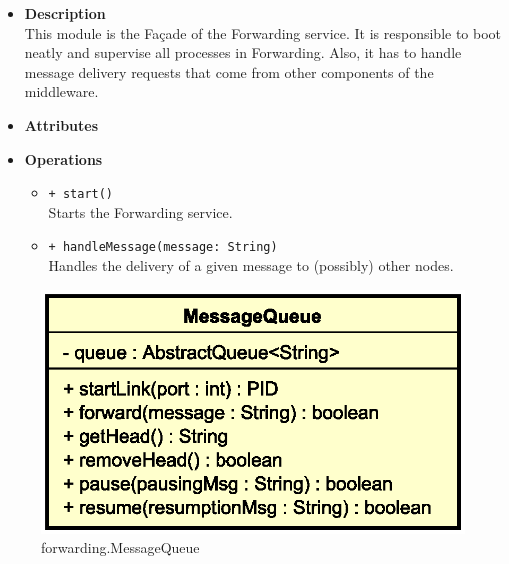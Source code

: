 \FloatBarrier
\begin{itemize}
  \item \textbf{Description} \\
    This module is the Fa\c cade of the Forwarding service. It is responsible
    to boot neatly and supervise all processes in Forwarding. Also, it has to
    handle message delivery requests that come from other components of the
    middleware.
  \item \textbf{Attributes}
  \item \textbf{Operations}
  \begin{itemize}
    \item \texttt{+ start()} \\
    Starts the Forwarding service.
    \item \texttt{+ handleMessage(message: String)} \\
    Handles the delivery of a given message to (possibly) other nodes.
  \end{itemize}
\end{itemize}


\begin{figure}[H]
  \centering
  \includegraphics[width=.5\columnwidth]{images/solution/mw/fwd/mq.eps}
  \caption{forwarding.MessageQueue}
  \label{fig:mw-forwarding-messagequeue}
\end{figure}

